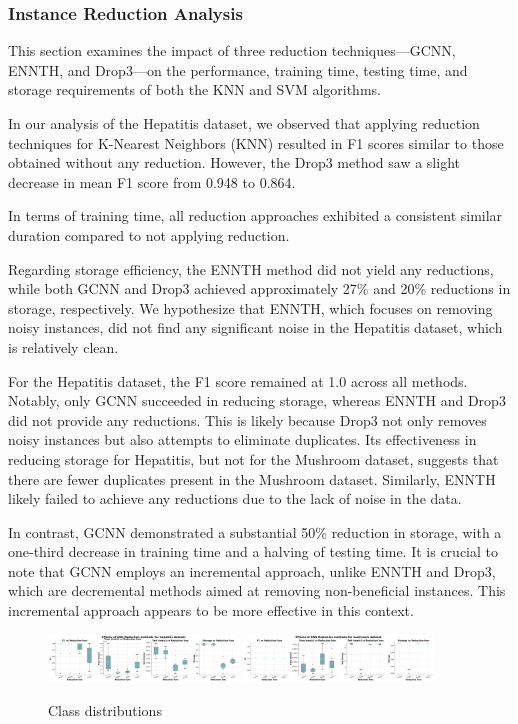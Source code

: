 \subsubsection{Instance Reduction Analysis}
\label{subsubsec:discussion-reduction}

This section examines the impact of three reduction techniques—GCNN, ENNTH, and Drop3—on the performance, training time, testing time, and storage requirements of both the KNN and SVM algorithms.



In our analysis of the Hepatitis dataset, we observed that applying reduction techniques for K-Nearest Neighbors (KNN) resulted in F1 scores similar to those obtained without any reduction. However, the Drop3 method saw a slight decrease in mean F1 score from 0.948 to 0.864. 

In terms of training time, all reduction approaches exhibited a consistent similar duration compared to not applying reduction.

Regarding storage efficiency, the ENNTH method did not yield any reductions, while both GCNN and Drop3 achieved approximately 27\% and 20\% reductions in storage, respectively. We hypothesize that ENNTH, which focuses on removing noisy instances, did not find any significant noise in the Hepatitis dataset, which is relatively clean.

For the Hepatitis dataset, the F1 score remained at 1.0 across all methods. Notably, only GCNN succeeded in reducing storage, whereas ENNTH and Drop3 did not provide any reductions. This is likely because Drop3 not only removes noisy instances but also attempts to eliminate duplicates. Its effectiveness in reducing storage for Hepatitis, but not for the Mushroom dataset, suggests that there are fewer duplicates present in the Mushroom dataset. Similarly, ENNTH likely failed to achieve any reductions due to the lack of noise in the data.

In contrast, GCNN demonstrated a substantial 50\% reduction in storage, with a one-third decrease in training time and a halving of testing time. It is crucial to note that GCNN employs an incremental approach, unlike ENNTH and Drop3, which are decremental methods aimed at removing non-beneficial instances. This incremental approach appears to be more effective in this context.

\begin{figure}
    \centering
    \includegraphics[width=0.45\textwidth]{figures/KNN_reduction_effects_hepatitis.png}
    \includegraphics[width=0.45\textwidth]{figures/KNN_reduction_effects_mushroom.png}
    \caption{Class distributions}
    \label{fig:KNN-reduction-effects}
\end{figure}

